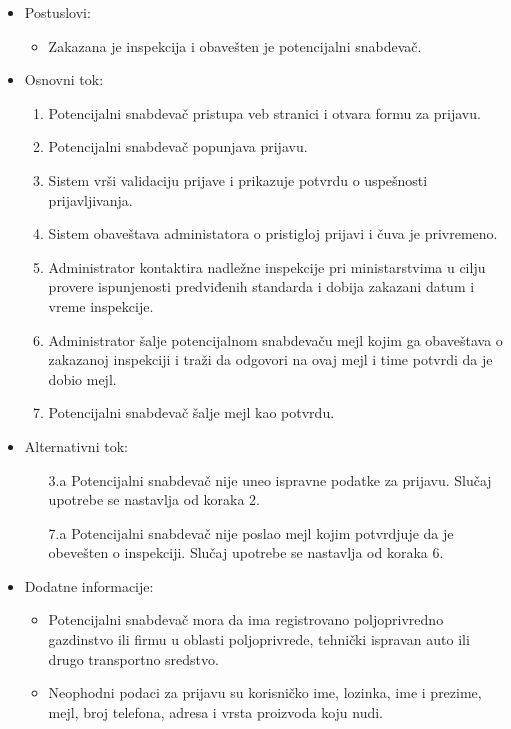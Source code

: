 \begin{itemize}
	\item Postuslovi:
		\begin{itemize}
					\item Zakazana je inspekcija i obavešten je potencijalni snabdevač.
		\end{itemize}		
	\item Osnovni tok:
		\begin{enumerate}
		    \item Potencijalni snabdevač pristupa veb stranici i otvara formu za prijavu.
		    \item Potencijalni snabdevač popunjava prijavu.
		    \item Sistem vrši validaciju prijave i prikazuje potvrdu o uspešnosti prijavljivanja.
		    \item Sistem obaveštava administatora o pristigloj prijavi i čuva je privremeno.
		    \item Administrator kontaktira nadležne inspekcije pri ministarstvima u cilju provere ispunjenosti predviđenih standarda i dobija zakazani datum i vreme inspekcije.
		    \item Administrator šalje potencijalnom snabdevaču mejl kojim ga obaveštava o zakazanoj inspekciji i traži da odgovori na ovaj mejl i time potvrdi da je dobio mejl.
		    \item Potencijalni snabdevač šalje mejl kao potvrdu.
		\end{enumerate}
	\item Alternativni tok:
		\begin{itemize}
    		\item[3.a] Potencijalni snabdevač nije uneo ispravne podatke za prijavu. Slučaj upotrebe se nastavlja od koraka 2.
		    \item[7.a] Potencijalni snabdevač nije poslao mejl kojim potvrdjuje da je obevešten o inspekciji. Slučaj upotrebe se nastavlja od koraka 6.
		\end{itemize} 
	\item Dodatne informacije:
		\begin{itemize}
		    \item Potencijalni snabdevač mora da ima registrovano poljoprivredno gazdinstvo ili firmu u oblasti poljoprivrede, tehnički ispravan auto ili drugo transportno sredstvo.
			\item Neophodni podaci za prijavu su korisničko ime, lozinka, ime i prezime, mejl, broj telefona, adresa i vrsta proizvoda koju nudi.
		\end{itemize}
						
\end{itemize}

